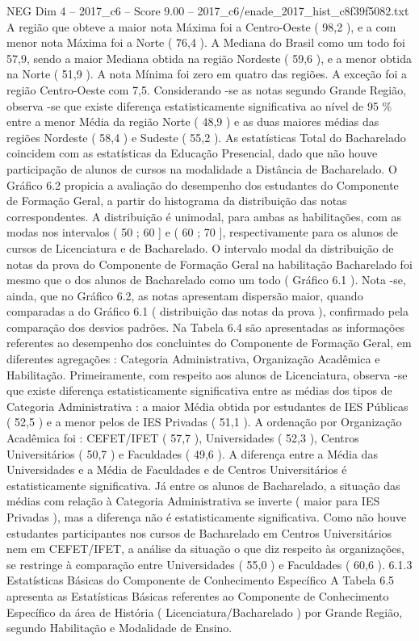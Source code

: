 \begin{textsample}{NEG Dim 4 – 2017\_c6 – Score 9.00 – 2017\_c6/enade\_2017\_hist\_c8f39f5082.txt}
A região que obteve a maior nota Máxima foi a Centro-Oeste ( 98,2 ), e a com menor nota Máxima foi a Norte ( 76,4 ).
A Mediana do Brasil como um todo foi 57,9, sendo a maior Mediana obtida na região Nordeste ( 59,6 ), e a menor obtida na Norte ( 51,9 ).
A nota Mínima foi zero em quatro das regiões.
A exceção foi a região Centro-Oeste com 7,5.
Considerando -se as notas segundo Grande Região, observa -se que existe diferença estatisticamente significativa ao nível de 95 \% entre a menor Média da região Norte ( 48,9 ) e as duas maiores médias das regiões Nordeste ( 58,4 ) e Sudeste ( 55,2 ).
As estatísticas Total do Bacharelado coincidem com as estatísticas da Educação Presencial, dado que não houve participação de alunos de cursos na modalidade a Distância de Bacharelado.
O Gráfico 6.2 propicia a avaliação do desempenho dos estudantes do Componente de Formação Geral, a partir do histograma da distribuição das notas correspondentes.
A distribuição é unimodal, para ambas as habilitações, com as modas nos intervalos ( 50 ; 60 ] e ( 60 ; 70 ], respectivamente para os alunos de cursos de Licenciatura e de Bacharelado.
O intervalo modal da distribuição de notas da prova do Componente de Formação Geral na habilitação Bacharelado foi mesmo que o dos alunos de Bacharelado como um todo ( Gráfico 6.1 ).
Nota -se, ainda, que no Gráfico 6.2, as notas apresentam dispersão maior, quando comparadas a do Gráfico 6.1 ( distribuição das notas da prova ), confirmado pela comparação dos desvios padrões.
Na Tabela 6.4 são apresentadas as informações referentes ao desempenho dos concluintes do Componente de Formação Geral, em diferentes agregações : Categoria Administrativa, Organização Acadêmica e Habilitação.
Primeiramente, com respeito aos alunos de Licenciatura, observa -se que existe diferença estatisticamente significativa entre as médias dos tipos de Categoria Administrativa : a maior Média obtida por estudantes de IES Públicas ( 52,5 ) e a menor pelos de IES Privadas ( 51,1 ).
A ordenação por Organização Acadêmica foi : CEFET/IFET ( 57,7 ), Universidades ( 52,3 ), Centros Universitários ( 50,7 ) e Faculdades ( 49,6 ).
A diferença entre a Média das Universidades e a Média de Faculdades e de Centros Universitários é estatisticamente significativa.
Já entre os alunos de Bacharelado, a situação das médias com relação à Categoria Administrativa se inverte ( maior para IES Privadas ), mas a diferença não é estatisticamente significativa.
Como não houve estudantes participantes nos cursos de Bacharelado em Centros Universitários nem em CEFET/IFET, a análise da situação o que diz respeito às organizações, se restringe à comparação entre Universidades ( 55,0 ) e Faculdades ( 60,6 ). 6.1.3 Estatísticas Básicas do Componente de Conhecimento Específico A Tabela 6.5 apresenta as Estatísticas Básicas referentes ao Componente de Conhecimento Específico da área de História ( Licenciatura/Bacharelado ) por Grande Região, segundo Habilitação e Modalidade de Ensino.

\end{textsample}
